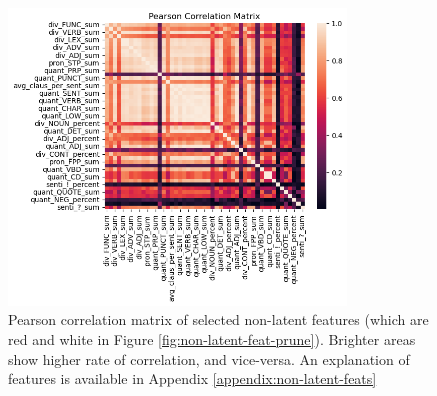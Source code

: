 \documentclass{article}
\begin{document}
\begin{appendices}
\pagebreak
{}\label{appendix:correlation-matrx}
\begin{figure}[H]
  \centering
  \includegraphics[width=0.8\textwidth]{img/non_latent_corr_matrx.png}
  \caption{Pearson correlation matrix of selected non-latent features (which are red and white in Figure \ref{fig:non-latent-feat-prune}). Brighter areas show higher rate of correlation, and vice-versa. An explanation of features is available in Appendix \ref{appendix:non-latent-feats}}
  \label{fig:correlation-matrx}
\end{figure}


\end{appendices}
\end{document}
